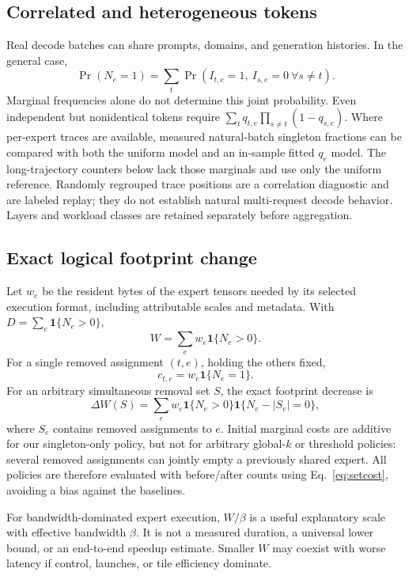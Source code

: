 \documentclass[10pt,twocolumn]{article}
\newcommand{\ind}{\mathbf{1}}
\begin{document}
\subsection{Correlated and heterogeneous tokens}
Real decode batches can share prompts, domains, and generation histories. In the general case,
\begin{equation}
\Pr(N_e=1)=\sum_t\Pr(I_{t,e}=1,\ I_{s,e}=0\ \forall s\ne t).
\end{equation}
Marginal frequencies alone do not determine this joint probability. Even independent but nonidentical tokens require $\sum_t q_{t,e}\prod_{s\ne t}(1-q_{s,e})$. Where per-expert traces are available, measured natural-batch singleton fractions can be compared with both the uniform model and an in-sample fitted $q_e$ model. The long-trajectory counters below lack those marginals and use only the uniform reference. Randomly regrouped trace positions are a correlation diagnostic and are labeled replay; they do not establish natural multi-request decode behavior. Layers and workload classes are retained separately before aggregation.

\subsection{Exact logical footprint change}
Let $w_e$ be the resident bytes of the expert tensors needed by its selected execution format, including attributable scales and metadata. With $D=\sum_e\ind\{N_e>0\}$,
\begin{equation}
W=\sum_e w_e\ind\{N_e>0\}.
\end{equation}
For a single removed assignment $(t,e)$, holding the others fixed,
\begin{equation}
c_{t,e}=w_e\ind\{N_e=1\}.
\end{equation}
For an arbitrary simultaneous removal set $S$, the exact footprint decrease is
\begin{equation}
\Delta W(S)=\sum_e w_e\ind\{N_e>0\}\ind\{N_e-|S_e|=0\},\label{eq:setcost}
\end{equation}
where $S_e$ contains removed assignments to $e$. Initial marginal costs are additive for our singleton-only policy, but not for arbitrary global-$k$ or threshold policies: several removed assignments can jointly empty a previously shared expert. All policies are therefore evaluated with before/after counts using Eq.~\eqref{eq:setcost}, avoiding a bias against the baselines.

For bandwidth-dominated expert execution, $W/\beta$ is a useful explanatory scale with effective bandwidth $\beta$. It is not a measured duration, a universal lower bound, or an end-to-end speedup estimate. Smaller $W$ may coexist with worse latency if control, launches, or tile efficiency dominate.
\end{document}

